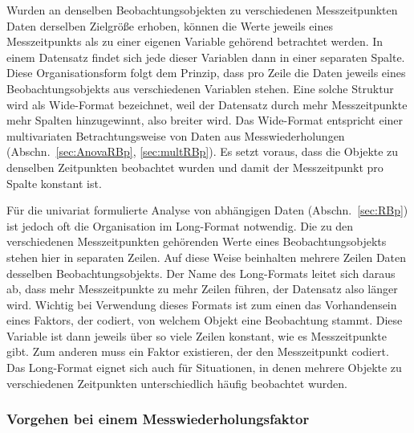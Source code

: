 Wurden an denselben Beobachtungsobjekten zu verschiedenen Messzeitpunkten Daten derselben Zielgröße erhoben, können die Werte jeweils eines Messzeitpunkts als zu einer eigenen Variable gehörend betrachtet werden. In einem Datensatz findet sich jede dieser Variablen dann in einer separaten Spalte. Diese Organisationsform folgt dem Prinzip, dass pro Zeile die Daten jeweils eines Beobachtungsobjekts aus verschiedenen Variablen stehen. Eine solche Struktur wird als Wide-Format bezeichnet, weil der Datensatz durch mehr Messzeitpunkte mehr Spalten hinzugewinnt, also breiter wird. Das Wide-Format entspricht einer multivariaten Betrachtungsweise von Daten aus Messwiederholungen (Abschn.\ \ref{sec:AnovaRBp}, \ref{sec:multRBp}). Es setzt voraus, dass die Objekte zu denselben Zeitpunkten beobachtet wurden und damit der Messzeitpunkt pro Spalte konstant ist.

Für die univariat formulierte Analyse von abhängigen Daten (Abschn.\ \ref{sec:RBp}) ist jedoch oft die Organisation im Long-Format notwendig. Die zu den verschiedenen Messzeitpunkten gehörenden Werte eines Beobachtungsobjekts stehen hier in separaten Zeilen. Auf diese Weise beinhalten mehrere Zeilen Daten desselben Beobachtungsobjekts. Der Name des Long-Formats leitet sich daraus ab, dass mehr Messzeitpunkte zu mehr Zeilen führen, der Datensatz also länger wird. Wichtig bei Verwendung dieses Formats ist zum einen das Vorhandensein eines Faktors, der codiert, von welchem Objekt eine Beobachtung stammt. Diese Variable ist dann jeweils über so viele Zeilen konstant, wie es Messzeitpunkte gibt. Zum anderen muss ein Faktor existieren, der den Messzeitpunkt codiert. Das Long-Format eignet sich auch für Situationen, in denen mehrere Objekte zu verschiedenen Zeitpunkten unterschiedlich häufig beobachtet wurden.

\subsubsection{Vorgehen bei einem Messwiederholungsfaktor}

